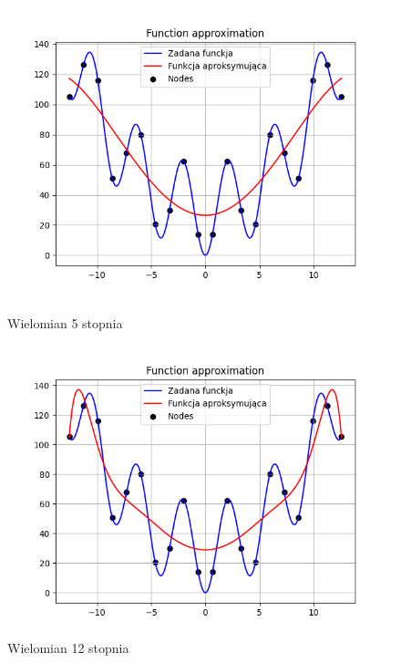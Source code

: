 \documentclass{article}
\begin{document}
\begin{figure}[H]
  \begin{minipage}[b]{0.49\textwidth}
    \begin{minipage}[b]{\textwidth}
      \includegraphics[width=\textwidth]{img06.png}
      \caption{Wielomian 5 stopnia}
    \end{minipage}
    \vspace*{\fill}
    \begin{minipage}[b]{\textwidth}
      \includegraphics[width=\textwidth]{img07.png}
      \caption{Wielomian 12 stopnia}
    \end{minipage}
  \end{minipage}
  \hfill
  \begin{minipage}[b]{0.49\textwidth}

\end{minipage}
\end{figure}
\end{document}
